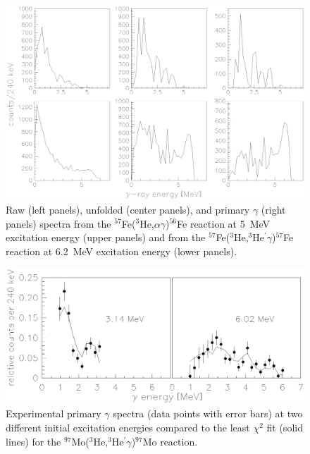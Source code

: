 \begin{figure}\centering
\includegraphics[totalheight=11.9cm]{fig2.eps}
\caption{Raw (left panels), unfolded (center panels), and primary $\gamma$ 
(right panels) spectra from the $^{57}$Fe($^3$He,$\alpha\gamma$)$^{56}$Fe 
reaction at 5~MeV excitation energy (upper panels) and from the  
$^{57}$Fe($^3$He,$^3$He$^\prime\gamma$)$^{57}$Fe reaction at 6.2~MeV excitation
energy (lower panels).}
\label{fig:feraw}
\end{figure}

\clearpage

\begin{figure}\centering
\includegraphics[totalheight=8.9cm]{fig3.eps}
\caption{Experimental primary $\gamma$ spectra (data points with error bars) at
two different initial excitation energies compared to the least $\chi^2$ fit
(solid lines) for the $^{97}$Mo($^3$He,$^3$He$^\prime\gamma$)$^{97}$Mo 
reaction.}
\label{fig:fgmo}
\end{figure}

\clearpage

